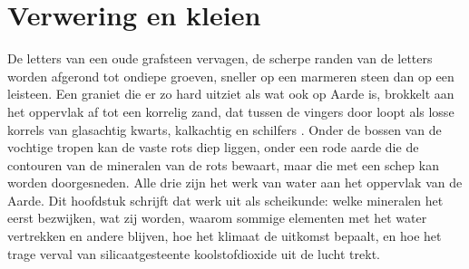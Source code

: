 \chapter{Verwering en kleien}\label{ch:b1:weathering-clays}

De letters van een oude grafsteen vervagen, de scherpe randen van de letters worden afgerond tot ondiepe groeven, sneller op een marmeren steen dan op een leisteen. Een graniet  die er zo hard uitziet als wat ook op Aarde is, brokkelt aan het oppervlak af tot een korrelig zand, dat tussen de vingers door loopt als losse korrels van glasachtig kwarts, kalkachtig  en schilfers . Onder de bossen van de vochtige tropen kan de vaste rots diep liggen, onder een rode aarde die de contouren van de mineralen van de rots bewaart, maar die met een schep kan worden doorgesneden. Alle drie zijn het werk van water aan het oppervlak van de Aarde. Dit hoofdstuk schrijft dat werk uit als scheikunde: welke mineralen het eerst bezwijken, wat zij worden, waarom sommige elementen met het water vertrekken en andere blijven, hoe het klimaat de uitkomst bepaalt, en hoe het trage verval van silicaatgesteente koolstofdioxide uit de lucht trekt.

